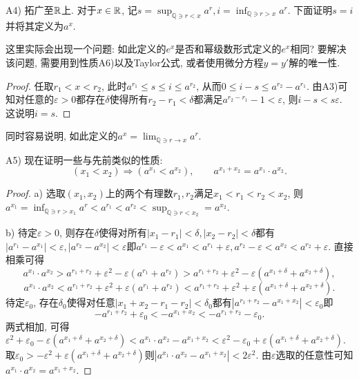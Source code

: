 A4) 拓广至$\mathbb{R}$上. 对于$x \in \mathbb{R}$, 记$\displaystyle  s=\sup_{\mathbb{Q} \ni r < x} a^r, i=\inf_{\mathbb{Q} \ni r > x} a^r$. 下面证明$s=i$并将其定义为$a^x$. 

\begin{remark}
	这里实际会出现一个问题: 如此定义的$e^x$是否和幂级数形式定义的$e^x$相同? 要解决该问题, 需要用到性质A6)以及Taylor公式, 或者使用微分方程$y=y'$解的唯一性. 
\end{remark}

\begin{proof}
	任取$r_1<x<r_2$, 此时$a^{r_1} \leq s \leq i \leq a^{r_2}$, 从而$0\leq i-s \leq a^{r_2}-a^{r_1}$. 由A3)可知对任意的$\varepsilon >0$都存在$\delta$使得所有$r_2-r_1<\delta$都满足$a^{r_2-r_1} - 1<\varepsilon$, 则$i-s < s\varepsilon$. 这说明$i=s$. 
\end{proof}
同时容易说明, 如此定义的$a^x = \lim_{\mathbb{Q} \ni r \to x} a^r$. 

\vspace{0.5em}
A5) 现在证明一些与先前类似的性质: 
$$(x_1 < x_2) \Rightarrow (a^{x_1} < a^{x_2}), \qquad a^{x_1+x_2} = a^{x_1} \cdot a^{x_2}.$$

\begin{proof}
	a) 选取$(x_1,x_2)$上的两个有理数$r_1,r_2$满足$x_1<r_1<r_2<x_2$, 则$a^{x_1} = \inf_{\mathbb{Q} \ni r > x_1} a^r < a^{r_1} < a^{r_2} < \sup_{\mathbb{Q} \ni r < x_2}=a^{x_2}$.
	
	b) 待定$\varepsilon >0$, 则存在$\delta$使得对所有$|x_1-r_1|<\delta ,|x_2-r_2|<\delta$都有$|a^{r_1}-a^{x_1}|<\varepsilon ,|a^{r_2}-a^{x_2}|<\varepsilon$即$a^{r_1}-\varepsilon < a^{x_1} < a^{r_1} + \varepsilon , a^{r_2}-\varepsilon < a^{x_2} < a^{r_2} + \varepsilon$. 直接相乘可得$$a^{x_1} \cdot a^{x_2} > a^{r_1+r_2}+\varepsilon ^2 - \varepsilon (a^{r_1}+a^{r_2}) > a^{r_1+r_2}+\varepsilon ^2 - \varepsilon (a^{x_1+\delta}+a^{x_2+\delta}),$$
		$$a^{x_1} \cdot a^{x_2} < a^{r_1+r_2}+\varepsilon ^2 + \varepsilon (a^{r_1}+a^{r_2}) < a^{r_1+r_2}+\varepsilon ^2 + \varepsilon (a^{x_1+\delta}+a^{x_2+\delta}).$$
	待定$\varepsilon _0$, 存在$\delta _0$使得对任意$|x_1+x_2-r_1-r_2|<\delta _0$都有$|a^{r_1+r_2} - a^{x_1+x_2}|<\varepsilon _0$即$$-a^{r_1+r_2} + \varepsilon _0 < -a^{x_1+x_2} < -a^{r_1+r_2} - \varepsilon _0.$$
	两式相加, 可得$\varepsilon ^2+\varepsilon _0 - \varepsilon (a^{x_1+\delta}+a^{x_2+\delta}) < a^{x_1} \cdot a^{x_2} - a^{x_1+x_2} < \varepsilon ^2 -\varepsilon _0 + \varepsilon (a^{x_1+\delta}+a^{x_2+\delta})$. 取$\varepsilon _0 > -\varepsilon ^2 + \varepsilon (a^{x_1+\delta}+a^{x_2+\delta})$则$|a^{x_1} \cdot a^{x_2} - a^{x_1+x_2} |< 2\varepsilon ^2$. 由$\varepsilon$选取的任意性可知$a^{x_1} \cdot a^{x_2} = a^{x_1+x_2}$. 
\end{proof}

